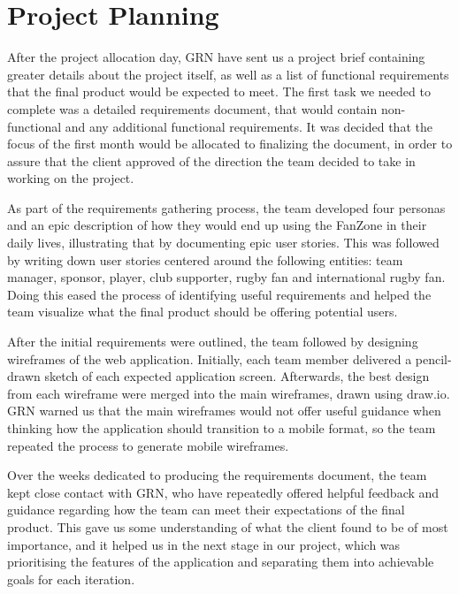 \documentclass{l3proj}
\begin{document}


\newpage
\section{Project Planning}
\label{sec:planning}

After the project allocation day, GRN have sent us a project brief containing greater details about the project itself, as well as a list of functional requirements that the final product would be expected to meet. The first task we needed to complete was a detailed requirements document, that would contain non-functional and any additional functional requirements. It was decided that the focus of the first month would be allocated to finalizing the document, in order to assure that the client approved of the direction the team decided to take in working on the project.

As part of the requirements gathering process, the team developed four personas and an epic description of how they would end up using the FanZone in their daily lives, illustrating that by documenting epic user stories. This was followed by writing down user stories centered around the following entities: team manager, sponsor, player, club supporter, rugby fan and international rugby fan. Doing this eased the process of identifying useful requirements and helped the team visualize what the final product should be offering potential users.

After the initial requirements were outlined, the team followed by designing wireframes of the web application. Initially, each team member delivered a pencil-drawn sketch of each expected application screen. Afterwards, the best design from each wireframe were merged into the main wireframes, drawn using draw.io. GRN warned us that the main wireframes would not offer useful guidance when thinking how the application should transition to a mobile format, so the team repeated the process to generate mobile wireframes.

Over the weeks dedicated to producing the requirements document, the team kept close contact with GRN, who have repeatedly offered helpful feedback and guidance regarding how the team can meet their expectations of the final product. This gave us some understanding of what the client found to be of most importance, and it helped us in the next stage in our project, which was prioritising the features of the application and separating them into achievable goals for each iteration.
\end{document}
